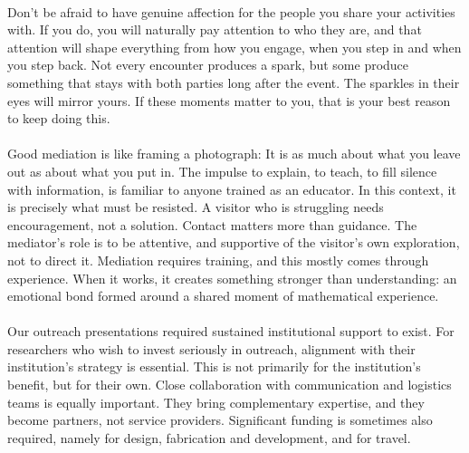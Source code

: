\documentclass{notices}
\begin{document}
\\


Don't be afraid to have genuine affection for the people you share your activities with. If you do, you will naturally pay attention to who they are, and that attention will shape everything from how you engage, when you step in and when you step back. Not every encounter produces a spark, but some produce something that stays with both parties long after the event. The sparkles in their eyes will mirror yours. If these moments matter to you, that is your best reason to keep doing this.\\
 

\\

Good mediation is like framing a photograph: It is as much about what you leave out as about what you put in. The impulse to explain, to teach, to fill silence  with information, is familiar to anyone trained as an educator. In this context, it is precisely what must be resisted.  A visitor who is struggling needs encouragement, not a solution. Contact matters more than guidance. The mediator's role is to be attentive, and supportive of the visitor's own exploration, not to direct it. Mediation requires training, and this mostly comes through experience. When it works, it creates something stronger than understanding: an emotional bond formed around a shared moment of mathematical experience.\\



\\

Our outreach presentations required sustained institutional support to exist. For researchers who wish to invest seriously in outreach, alignment with their institution's strategy is essential. This is not primarily for the institution's benefit, but for their own. Close collaboration with communication and logistics teams is equally important. They bring complementary expertise, and they become partners, not service providers. Significant funding is sometimes also required, namely for design, fabrication and development, and for travel. 
\end{document}
